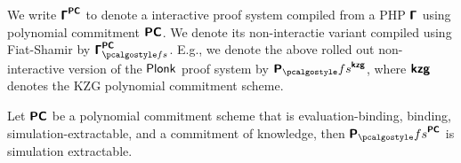 \documentclass[runningheads,11pt]{llncs}
\begin{document}
We write $\bm{\mathsf{\Gamma}}^{\bm{\mathsf{PC}}}$ to denote a interactive proof system compiled from a PHP $\bm{\mathsf{\Gamma}}$ using
polynomial commitment $\bm{\mathsf{PC}}$. We denote its non-interactie variant compiled using Fiat-Shamir by $\PHP^{\PCOM}_{\fs}$. E.g., we denote the above rolled out non-interactive version of the
$\textnormal{\textsf{Plonk}}$ proof system by $\plonkprotfs^{\kzg}$, where $\bm{\mathsf{kzg}}$ denotes the KZG
polynomial commitment scheme.

\begin{theorem}
  Let $\bm{\mathsf{PC}}$ be a polynomial commitment scheme that is evaluation-binding, binding, simulation-extractable, and a commitment of knowledge,
  then $\plonkprotfs^{\PCOM}$ is simulation extractable.
\end{theorem}
\end{document}
